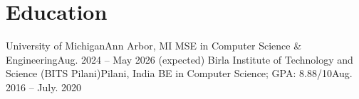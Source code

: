 \section{Education}
\vspace{-10pt}
\resumeSubheading
{University of Michigan}{Ann Arbor, MI}
{MSE in Computer Science \& Engineering}{Aug. 2024 -- May 2026 (expected)}
\vspace{2pt}
\resumeSubheading
{Birla Institute of Technology and Science (BITS Pilani)}{Pilani, India}
{BE in Computer Science;  GPA: 8.88/10}{Aug. 2016 -- July. 2020}
